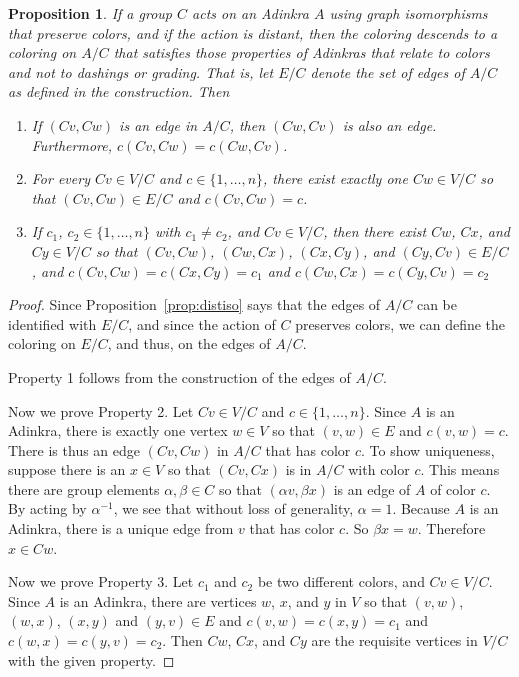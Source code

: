 \documentclass[12pt,twoside,singlespace]{article}
\numberwithin{equation}{section}
\newtheorem{prop}[equation]{Proposition}
\theoremstyle{definition}
\begin{document}
\begin{prop}
\label{prop:quotient}
If a group $C$ acts on an Adinkra $A$ using graph isomorphisms that preserve colors, and if the action is distant, then the coloring descends to a coloring on $A/C$ that satisfies those properties of Adinkras that relate to colors and not to dashings or grading.  That is, let $E/C$ denote the set of edges of $A/C$ as defined in the construction.  Then
\begin{enumerate}
\item If $(Cv,Cw)$ is an edge in $A/C$, then $(Cw,Cv)$ is also an edge.  Furthermore, $c(Cv,Cw)=c(Cw,Cv)$.
\item For every $Cv\in V/C$ and $c\in \{1,\ldots,n\}$, there exist exactly one $Cw\in V/C$ so that $(Cv,Cw)\in E/C$ and $c(Cv,Cw)=c$.
\item If $c_1$, $c_2\in \{1,\ldots,n\}$ with $c_1\not=c_2$, and $Cv\in V/C$, then there exist $Cw$, $Cx$, and $Cy\in V/C$ so that $(Cv,Cw)$, $(Cw,Cx)$, $(Cx,Cy)$, and $(Cy,Cv)\in E/C$, and $c(Cv,Cw)=c(Cx,Cy)=c_1$ and $c(Cw,Cx)=c(Cy,Cv)=c_2$
\end{enumerate}
\end{prop}
\begin{proof}
Since Proposition~\ref{prop:distiso} says that the edges of $A/C$ can be identified with $E/C$, and since the action of $C$ preserves colors, we can define the coloring on $E/C$, and thus, on the edges of $A/C$.

Property 1 follows from the construction of the edges of $A/C$.

Now we prove Property 2.  Let $Cv\in V/C$ and $c\in\{1,\ldots,n\}$.  Since $A$ is an Adinkra, there is exactly one vertex $w\in V$ so that $(v,w)\in E$ and $c(v,w)=c$.  There is thus an edge $(Cv,Cw)$ in $A/C$ that has color $c$.  To show uniqueness, suppose there is an $x\in V$ so that $(Cv,Cx)$ is in $A/C$ with color $c$.  This means there are group elements $\alpha,\beta\in C$ so that $(\alpha v,\beta x)$ is an edge of $A$ of color $c$.  By acting by $\alpha^{-1}$, we see that without loss of generality, $\alpha=1$.  Because $A$ is an Adinkra, there is a unique edge from $v$ that has color $c$.  So $\beta x = w$.  Therefore $x\in Cw$.

Now we prove Property 3.  Let $c_1$ and $c_2$ be two different colors, and $Cv\in V/C$.  Since $A$ is an Adinkra, there are vertices $w$, $x$, and $y$ in $V$ so that $(v,w)$, $(w,x)$, $(x,y)$ and $(y,v)\in E$ and $c(v,w)=c(x,y)=c_1$ and $c(w,x)=c(y,v)=c_2$.  Then $Cw$, $Cx$, and $Cy$ are the requisite vertices in $V/C$ with the given property.
\end{proof}
\end{document}
